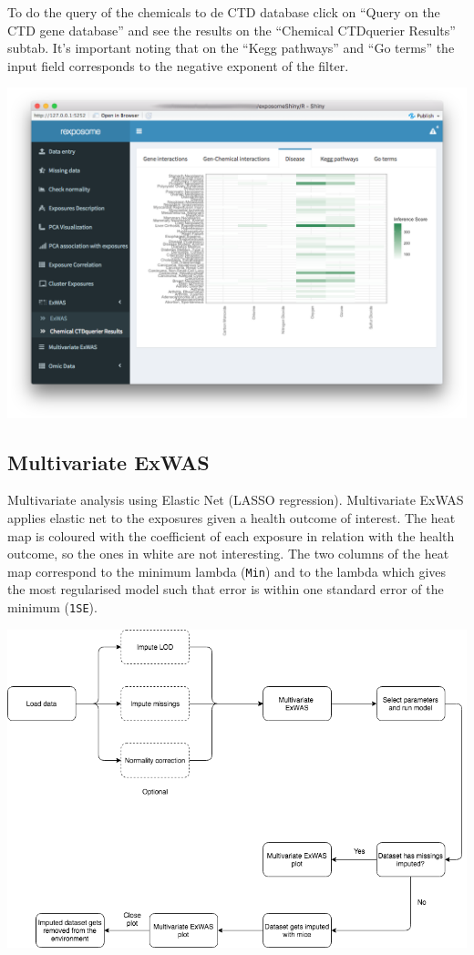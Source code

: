 \documentclass[
]{book}
\begin{document}
To do the query of the chemicals to de CTD database click on ``Query on the CTD gene database'' and see the results on the ``Chemical CTDquerier Results'' subtab. It's important noting that on the ``Kegg pathways'' and ``Go terms'' the input field corresponds to the negative exponent of the filter.

\includegraphics{images/analysis7_6.png}

\hypertarget{multivariate-exwas}{%
\subsection{Multivariate ExWAS}\label{multivariate-exwas}}

Multivariate analysis using Elastic Net (LASSO regression). Multivariate ExWAS applies elastic net to the exposures given a health outcome of interest. The heat map is coloured with the coefficient of each exposure in relation with the health outcome, so the ones in white are not interesting. The two columns of the heat map correspond to the minimum lambda (\texttt{Min}) and to the lambda which gives the most regularised model such that error is within one standard error of the minimum (\texttt{1SE}).

\includegraphics{images/analysis8_1.png}
\end{document}
